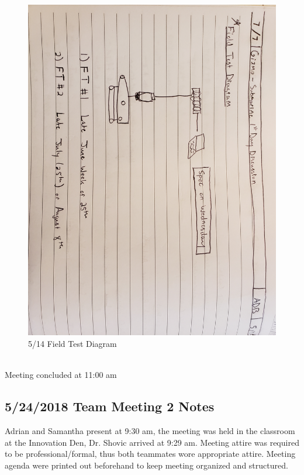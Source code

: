\documentclass[12pt]{article}
\begin{document}
\begin{itemize}
\begin{figure}[!htb]
					\includegraphics[width=130mm]{assets/Field_Test_Diagram.jpg}
					\caption{5/14 Field Test Diagram \label{overflow}}
				\end{figure}
			\end{itemize}
		
			\noindent
			\\Meeting concluded at 11:00 am
			
			\clearpage
			
		\subsection{5/24/2018 Team Meeting 2 Notes}
		
			\noindent
			Adrian and Samantha present at 9:30 am, the meeting was held in the classroom at the Innovation Den, Dr. Shovic arrived at 9:29 am. Meeting attire was required to be professional/formal, thus both teammates wore appropriate attire. Meeting agenda were printed out beforehand to keep meeting organized and structured.
			
\end{document}
